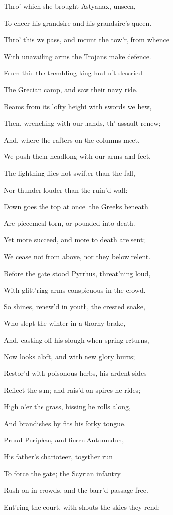 Thro’ which she brought Astyanax, unseen,

To cheer his grandsire and his grandsire’s queen.

Thro’ this we pass, and mount the tow’r, from whence

With unavailing arms the Trojans make defence.

From this the trembling king had oft descried

The Grecian camp, and saw their navy ride.

Beams from its lofty height with swords we hew,

Then, wrenching with our hands, th’ assault renew;

And, where the rafters on the columns meet,

We push them headlong with our arms and feet.

The lightning flies not swifter than the fall,

Nor thunder louder than the ruin’d wall:

Down goes the top at once; the Greeks beneath

Are piecemeal torn, or pounded into death.

Yet more succeed, and more to death are sent;

We cease not from above, nor they below relent.

Before the gate stood Pyrrhus, threat’ning loud,

With glitt’ring arms conspicuous in the crowd.

So shines, renew’d in youth, the crested snake,

Who slept the winter in a thorny brake,

And, casting off his slough when spring returns,

Now looks aloft, and with new glory burns;

Restor’d with poisonous herbs, his ardent sides

Reflect the sun; and rais’d on spires he rides;

High o’er the grass, hissing he rolls along,

And brandishes by fits his forky tongue.

Proud Periphas, and fierce Automedon,

His father’s charioteer, together run

To force the gate; the Scyrian infantry

Rush on in crowds, and the barr’d passage free.

Ent’ring the court, with shouts the skies they rend;

